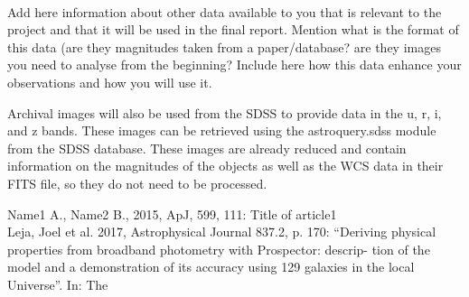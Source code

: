 \documentclass[11pt]{article}
\begin{document}
%
% 
%
\smallskip
{}
\smallskip\\

Add here information about other data available to you that is relevant to the project and that it will be used in the final report. Mention what is the format of this data (are they magnitudes taken from a paper/database? are they images you need to analyse from the beginning? Include here how this data enhance your observations and how you will use it.

Archival images will also be used from the SDSS to provide data in the u, r, i, and z bands. These images can
be retrieved using the astroquery.sdss module from the SDSS database. These images are already reduced and contain information on the magnitudes of the objects as well as the WCS data
in their FITS file, so they do not need to be processed.


%
%
%
%
\smallskip
{}
\smallskip

\noindent Name1 A., Name2 B., 2015, ApJ, 599, 111: Title of article1
\smallskip\\
Leja, Joel et al. 2017, Astrophysical Journal 837.2, p. 170: “Deriving physical properties from broadband photometry with Prospector: descrip-
tion of the model and a demonstration of its accuracy using 129 galaxies in the local Universe”. In: The
\smallskip\\



\end{document}
